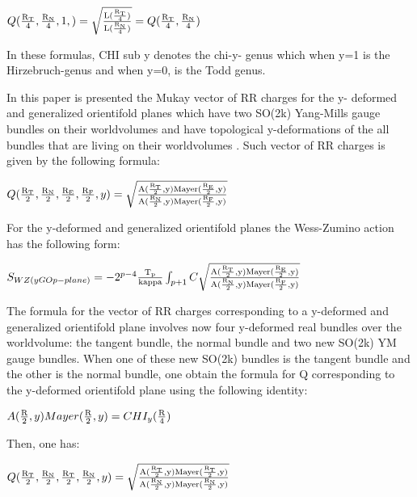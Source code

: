 \documentclass[a4paper,a4paper]{article}
\begin{document}
\begin{center}
{  $ Q(\frac{\rm R_T}{\rm 4},\frac{\rm R_N}{\rm 4},1,) =\sqrt{\frac{\rm L(\frac{\rm R_T}{\rm 4})}{\rm L(\frac{\rm R_N}{\rm 4})}}=Q(\frac{\rm R_T}{\rm 4},\frac{\rm R_N}{\rm 4}) $ }
\end{center}
In these formulas, CHI sub y  denotes the chi-y- genus which when y=1 is the Hirzebruch-genus and when y=0, is the Todd genus.

In this paper is presented the Mukay vector of RR charges for the  y- deformed and generalized orientifold planes which have two SO(2k) Yang-Mills gauge bundles on their worldvolumes and have topological y-deformations of the all bundles that are living on their worldvolumes .  Such vector of RR charges is given by the following formula:

\begin{center}
{  $ Q(\frac{\rm R_T}{\rm 2},\frac{\rm R_N}{\rm 2},\frac{\rm R_E}{\rm 2},\frac{\rm R_F}{\rm 2},y) =\sqrt{\frac{\rm A(\frac{\rm R_T}{\rm 2},y)Mayer(\frac{\rm R_E}{\rm 2},y)}{\rm A(\frac{\rm R_N}{\rm 2},y)Mayer(\frac{\rm R_F}{\rm 2},y)}} $ }
\end{center}
For the y-deformed and generalized  orientifold planes the Wess-Zumino action has the following form:

\begin{center}
{  $ S_{WZ(yGOp-plane)} = -2^{p-4}\frac{\rm T_p}{\rm kappa}\int_{p+1} C\sqrt{\frac{\rm A(\frac{\rm R_T}{\rm 2},y)Mayer(\frac{\rm R_E}{\rm 2},y)}{\rm A(\frac{\rm R_N}{\rm 2},y)Mayer(\frac{\rm R_F}{\rm 2},y)}}$ }
\end{center}
The formula for the vector of RR charges corresponding to a y-deformed and generalized orientifold plane involves now   four y-deformed real bundles over the worldvolume: the tangent bundle, the normal bundle and two new SO(2k) YM gauge bundles.
When one of these new SO(2k) bundles is the tangent bundle and the other is the normal bundle, one obtain the  formula for Q corresponding to the y-deformed orientifold plane using the following identity:
\begin{center}
 
{  $A(\frac{\rm R}{\rm 2},y)Mayer(\frac{\rm R}{\rm 2},y) 
 = CHI_y(\frac{\rm R}{\rm 4})$}
\end{center}
Then, one has:

\begin{center}
{  $ Q(\frac{\rm R_T}{\rm 2},\frac{\rm R_N}{\rm 2},\frac{\rm R_T}{\rm 2},\frac{\rm R_N}{\rm 2},y) =\sqrt{\frac{\rm A(\frac{\rm R_T}{\rm 2},y)Mayer(\frac{\rm R_T}{\rm 2},y)}{\rm A(\frac{\rm R_N}{\rm 2},y)Mayer(\frac{\rm R_N}{\rm 2},y)}} $ }
\end{center}
\end{document}
